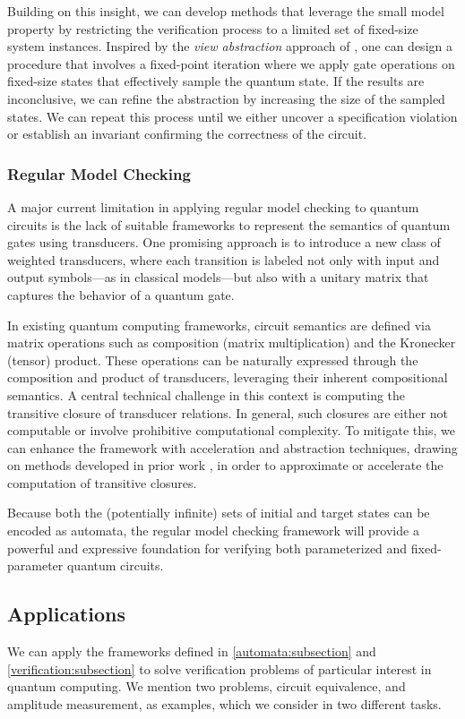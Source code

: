 Building on this insight, we can develop methods that leverage the small model property by restricting the verification process to a limited set of fixed-size system instances.
Inspired by the \emph{view abstraction} approach of \citep{DBLP:journals/sttt/AbdullaHH16}, one can design a procedure that involves a fixed-point iteration where we apply gate operations on fixed-size states that effectively sample the quantum state.
If the results are inconclusive, we can refine the abstraction by increasing the size of the sampled states.
We can repeat this process until we either uncover a specification violation or establish an invariant confirming the correctness of the circuit.

\subsubsection{\textbf{Regular Model Checking}}
A major current limitation in applying regular model checking to quantum circuits is the lack of suitable frameworks to represent the semantics of quantum gates using transducers.
%
One promising approach is to introduce a new class of weighted transducers, where each transition is labeled not only with input and output symbols—as in classical models—but also with a unitary matrix that captures the behavior of a quantum gate.
%

In existing quantum computing frameworks, circuit semantics are defined via matrix operations such as composition (matrix multiplication) and the Kronecker (tensor) product.
%
These operations can be naturally expressed through the composition and product of transducers, leveraging their inherent compositional semantics.
%
A central technical challenge in this context is computing the transitive closure of transducer relations.
%
In general, such closures are either not computable or involve prohibitive computational complexity.
%
To mitigate this, we can enhance the framework with acceleration and abstraction techniques, drawing on methods developed in prior work \citep{DBLP:conf/tacas/AbdullaDHR07}, in order to approximate or accelerate the computation of transitive closures.
%

Because both the (potentially infinite) sets of initial and target states can be encoded as automata, the regular model checking framework will provide a powerful and expressive foundation for verifying both parameterized and fixed-parameter quantum circuits.
%

\subsection{Applications}
We can apply the frameworks defined in \cref{automata:subsection} and \cref{verification:subsection} to solve verification problems of particular interest in quantum computing.
%
We mention two problems, circuit equivalence, and amplitude measurement, as examples, which we consider in two different tasks.

